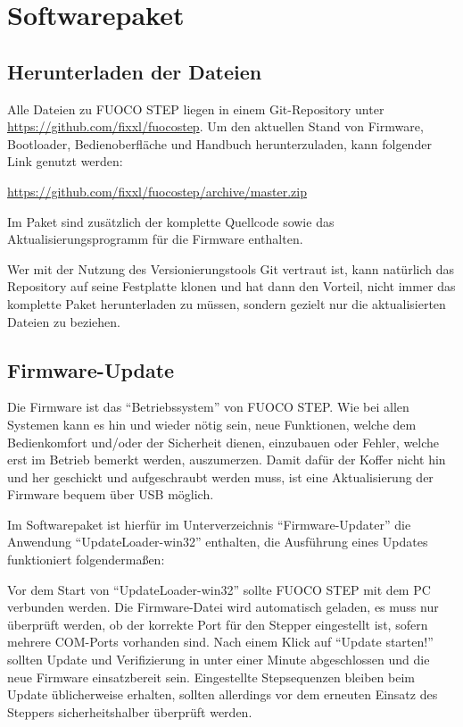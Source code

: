 \documentclass[paper=a4, open=any, numbers=noenddot]{scrbook}
\begin{document}
	\chapter{Softwarepaket}

		\section{Herunterladen der Dateien}

			Alle Dateien zu FUOCO STEP liegen in einem Git-Repository unter \url{https://github.com/fixxl/fuocostep}. Um den aktuellen Stand von Firmware, Bootloader, Bedienoberfläche und Handbuch herunterzuladen, kann folgender Link genutzt werden:
			\begin{center}
				\url{https://github.com/fixxl/fuocostep/archive/master.zip}
			\end{center}
			Im Paket sind zusätzlich der komplette Quellcode sowie das Aktualisierungsprogramm für die Firmware enthalten.

			Wer mit der Nutzung des Versionierungstools Git vertraut ist, kann natürlich das Repository auf seine Festplatte klonen und hat dann den Vorteil, nicht immer das komplette Paket herunterladen zu müssen, sondern gezielt nur die aktualisierten Dateien zu beziehen.

		\section{Firmware-Update}

			Die Firmware ist das \enquote{Betriebssystem} von FUOCO STEP. Wie bei allen Systemen kann es hin und wieder nötig sein, neue Funktionen, welche dem Bedienkomfort und/oder der Sicherheit dienen, einzubauen oder Fehler, welche erst im Betrieb bemerkt werden, auszumerzen. Damit dafür der Koffer nicht hin und her geschickt und aufgeschraubt werden muss, ist eine Aktualisierung der Firmware bequem über USB möglich.

			Im Softwarepaket ist hierfür im Unterverzeichnis \enquote{Firmware-Updater} die Anwendung \enquote{UpdateLoader-win32} enthalten, die Ausführung eines Updates funktioniert folgendermaßen:

			Vor dem Start von \enquote{UpdateLoader-win32} sollte FUOCO STEP mit dem PC verbunden werden. Die Firmware-Datei wird automatisch geladen, es muss nur überprüft werden, ob der korrekte Port für den Stepper eingestellt ist, sofern mehrere COM-Ports vorhanden sind. Nach einem Klick auf \enquote{Update starten!} sollten Update und Verifizierung in unter einer Minute abgeschlossen und die neue Firmware einsatzbereit sein. Eingestellte Stepsequenzen bleiben beim Update üblicherweise erhalten, sollten allerdings vor dem erneuten Einsatz des Steppers sicherheitshalber überprüft werden.
\end{document}
